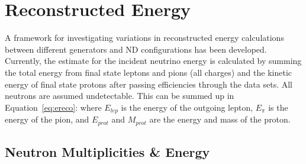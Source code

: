 \documentclass[12pt]{article}
\begin{document}
\section{Reconstructed Energy}\label{sec:Reco}

A framework for investigating variations in reconstructed energy calculations between different generators and ND configurations has been developed. %
Currently, the estimate for the incident neutrino energy is calculated by summing the total energy from final state leptons and pions (all charges) and the kinetic energy of final state protons after passing efficiencies through the data sets. All neutrons are assumed undetectable. 
This can be summed up in Equation~\ref{eq:ereco}:
where $E_{lep}$ is the energy of the outgoing lepton, $E_{\pi}$ is the energy of the pion, and $E_{prot}$ and $M_{prot}$ are the energy and mass of the proton.




\subsection{Neutron Multiplicities \& Energy}
\label{sec:N_multiplicities_Energy}
\end{document}
